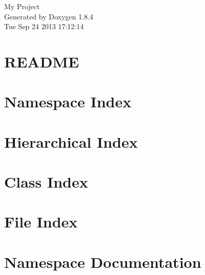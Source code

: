 \documentclass[twoside]{book}
\newcommand{\clearemptydoublepage}{%
  \newpage{\pagestyle{empty}\cleardoublepage}%
}
\begin{document}
\hypersetup{pageanchor=false}
\begin{titlepage}
\vspace*{7cm}
\begin{center}%
{\Large My Project }\\
\vspace*{1cm}
{\large Generated by Doxygen 1.8.4}\\
\vspace*{0.5cm}
{\small Tue Sep 24 2013 17:12:14}\\
\end{center}
\end{titlepage}
\clearemptydoublepage
\tableofcontents
\clearemptydoublepage
{}
\hypersetup{pageanchor=true}

\chapter{R\-E\-A\-D\-M\-E}
\label{md_README}
\hypertarget{md_README}{}

\chapter{Namespace Index}

\chapter{Hierarchical Index}

\chapter{Class Index}

\chapter{File Index}

\chapter{Namespace Documentation}


\end{document}
